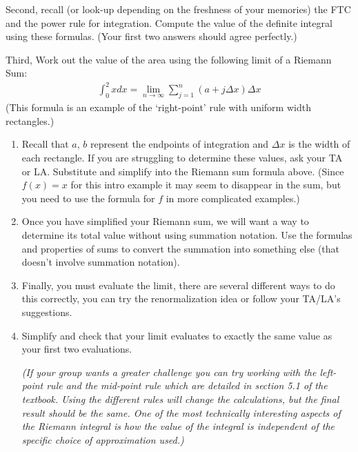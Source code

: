 \documentclass{ximera}
\begin{document}
\begin{exercise}
    Second, recall (or look-up depending on the freshness of your memories) the FTC and the power rule for integration. Compute the value of the definite integral using these formulas. (Your first two answers should agree perfectly.)
\end{exercise}

\begin{exercise}
    Third, Work out the value of the area using the following limit of a Riemann Sum:
\begin{align}
	\int_{0}^2 x dx = \lim_{n\rightarrow \infty} \sum_{j=1}^n (a + j\Delta x)\Delta x \nonumber
\end{align}
    (This formula is an example of the `right-point' rule with uniform width rectangles.)\\
    \begin{enumerate}
        \item Recall that $a$, $b$ represent the endpoints of integration and $\Delta x$ is the width of each rectangle.  If you are struggling to determine these values, ask your TA or LA. Substitute and simplify into the Riemann sum formula above. (Since $f(x)=x$ for this intro example it may seem to disappear in the sum, but you need to use the formula for $f$ in more complicated examples.)
        
        \item Once you have simplified your Riemann sum, we will want a way to determine its total value without using summation notation. Use the formulas and properties of sums to convert the summation into something else (that doesn't involve summation notation).
        
        \item Finally, you must evaluate the limit, there are several different ways to do this correctly, you can try the renormalization idea or follow your TA/LA's suggestions.


        \item Simplify and check that your limit evaluates to exactly the same value as your first two evaluations.

        \textit{(If your group wants a greater challenge you can try working with the left-point rule and the mid-point rule which are detailed in section 5.1 of the textbook. Using the different rules will change the calculations, but the final result should be the same. One of the most technically interesting aspects of the Riemann integral is how the value of the integral is independent of the specific choice of approximation used.)}
    \end{enumerate}
\end{exercise}
\end{document}
